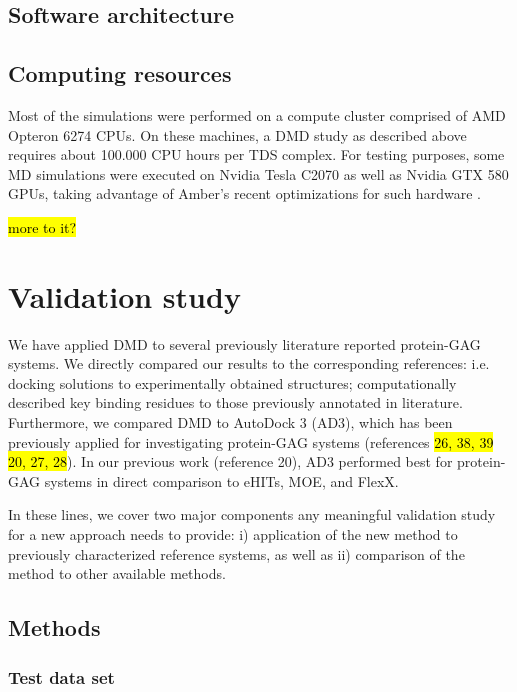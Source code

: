 \subsection{Software architecture}
\hl{\lipsum[1-2]}


\subsection{Computing resources}

Most of the simulations were performed on a compute cluster comprised of AMD
Opteron 6274 CPUs. On these machines, a DMD study as
described above requires about 100.000 CPU hours per TDS complex.
For testing purposes, some MD simulations were executed on Nvidia Tesla C2070
as well as Nvidia GTX 580 GPUs, taking advantage of Amber's recent optimizations
for such hardware \cite{amber_gpu_2012}.

\hl{more to it?}


\section{Validation study}

We have applied DMD to several previously literature reported protein-GAG
systems. We directly compared our results to the corresponding references: i.e.
docking solutions to experimentally obtained structures; computationally
described key binding residues to those previously annotated in literature.
Furthermore, we compared DMD to AutoDock 3 (AD3), which has been previously
applied for investigating protein-GAG systems (references \hl{ 26, 38, 39 20,
27, 28}). In our previous work (reference 20), AD3 performed best for protein-
GAG systems in direct comparison to eHITs, MOE, and FlexX.

In these lines, we cover two major components any meaningful
validation study for a new approach needs to provide: i) application of the new
method to previously characterized reference systems, as well as ii) comparison
of the method to other available methods.



\subsection{Methods}
\subsubsection{Test data set}

